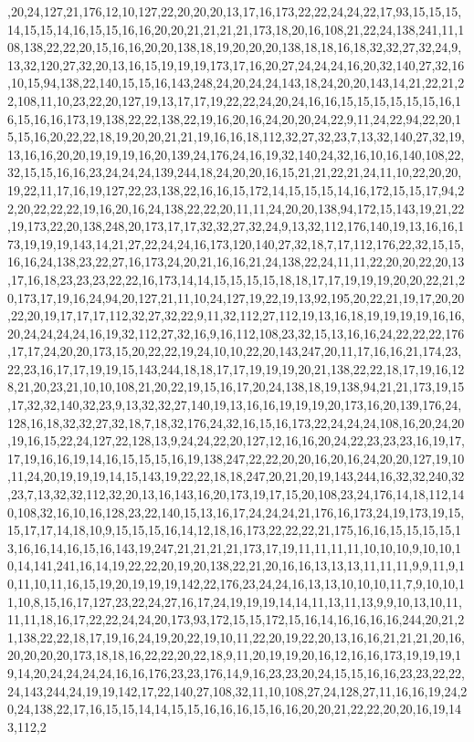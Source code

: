 ,20,24,127,21,176,12,10,127,22,20,20,20,13,17,16,173,22,22,24,24,22,17,93,15,15,15,14,15,15,14,16,15,15,16,16,20,20,21,21,21,21,173,18,20,16,108,21,22,24,138,241,11,108,138,22,22,20,15,16,16,20,20,138,18,19,20,20,20,138,18,18,16,18,32,32,27,32,24,9,13,32,120,27,32,20,13,16,15,19,19,19,173,17,16,20,27,24,24,24,16,20,32,140,27,32,16,10,15,94,138,22,140,15,15,16,143,248,24,20,24,24,143,18,24,20,20,143,14,21,22,21,22,108,11,10,23,22,20,127,19,13,17,17,19,22,22,24,20,24,16,16,15,15,15,15,15,15,16,16,15,16,16,173,19,138,22,22,138,22,19,16,20,16,24,20,20,24,22,9,11,24,22,94,22,20,15,15,16,20,22,22,18,19,20,20,21,21,19,16,16,18,112,32,27,32,23,7,13,32,140,27,32,19,13,16,16,20,20,19,19,19,16,20,139,24,176,24,16,19,32,140,24,32,16,10,16,140,108,22,32,15,15,16,16,23,24,24,24,139,244,18,24,20,20,16,15,21,21,22,21,24,11,10,22,20,20,19,22,11,17,16,19,127,22,23,138,22,16,16,15,172,14,15,15,15,14,16,172,15,15,17,94,22,20,22,22,22,19,16,20,16,24,138,22,22,20,11,11,24,20,20,138,94,172,15,143,19,21,22,19,173,22,20,138,248,20,173,17,17,32,32,27,32,24,9,13,32,112,176,140,19,13,16,16,173,19,19,19,143,14,21,27,22,24,24,16,173,120,140,27,32,18,7,17,112,176,22,32,15,15,16,16,24,138,23,22,27,16,173,24,20,21,16,16,21,24,138,22,24,11,11,22,20,20,22,20,13,17,16,18,23,23,23,22,22,16,173,14,14,15,15,15,15,18,18,17,17,19,19,19,20,20,22,21,20,173,17,19,16,24,94,20,127,21,11,10,24,127,19,22,19,13,92,195,20,22,21,19,17,20,20,22,20,19,17,17,17,112,32,27,32,22,9,11,32,112,27,112,19,13,16,18,19,19,19,19,16,16,20,24,24,24,24,16,19,32,112,27,32,16,9,16,112,108,23,32,15,13,16,16,24,22,22,22,176,17,17,24,20,20,173,15,20,22,22,19,24,10,10,22,20,143,247,20,11,17,16,16,21,174,23,22,23,16,17,17,19,19,15,143,244,18,18,17,17,19,19,19,20,21,138,22,22,18,17,19,16,128,21,20,23,21,10,10,108,21,20,22,19,15,16,17,20,24,138,18,19,138,94,21,21,173,19,15,17,32,32,140,32,23,9,13,32,32,27,140,19,13,16,16,19,19,19,20,173,16,20,139,176,24,128,16,18,32,32,27,32,18,7,18,32,176,24,32,16,15,16,173,22,24,24,24,108,16,20,24,20,19,16,15,22,24,127,22,128,13,9,24,24,22,20,127,12,16,16,20,24,22,23,23,23,16,19,17,17,19,16,16,19,14,16,15,15,15,16,19,138,247,22,22,20,20,16,20,16,24,20,20,127,19,10,11,24,20,19,19,19,14,15,143,19,22,22,18,18,247,20,21,20,19,143,244,16,32,32,240,32,23,7,13,32,32,112,32,20,13,16,143,16,20,173,19,17,15,20,108,23,24,176,14,18,112,140,108,32,16,10,16,128,23,22,140,15,13,16,17,24,24,24,21,176,16,173,24,19,173,19,15,15,17,17,14,18,10,9,15,15,15,16,14,12,18,16,173,22,22,22,21,175,16,16,15,15,15,15,13,16,16,14,16,15,16,143,19,247,21,21,21,21,173,17,19,11,11,11,11,10,10,10,9,10,10,10,14,141,241,16,14,19,22,22,20,19,20,138,22,21,20,16,16,13,13,13,11,11,11,9,9,11,9,10,11,10,11,16,15,19,20,19,19,19,142,22,176,23,24,24,16,13,13,10,10,10,11,7,9,10,10,11,10,8,15,16,17,127,23,22,24,27,16,17,24,19,19,19,14,14,11,13,11,13,9,9,10,13,10,11,11,11,18,16,17,22,22,24,24,20,173,93,172,15,15,172,15,16,14,16,16,16,16,244,20,21,21,138,22,22,18,17,19,16,24,19,20,22,19,10,11,22,20,19,22,20,13,16,16,21,21,21,20,16,20,20,20,20,173,18,18,16,22,22,20,22,18,9,11,20,19,19,20,16,12,16,16,173,19,19,19,19,14,20,24,24,24,24,16,16,176,23,23,176,14,9,16,23,23,20,24,15,15,16,16,23,23,22,22,24,143,244,24,19,19,142,17,22,140,27,108,32,11,10,108,27,24,128,27,11,16,16,19,24,20,24,138,22,17,16,15,15,14,14,15,15,16,16,16,15,16,16,20,20,21,22,22,20,20,16,19,143,112,2